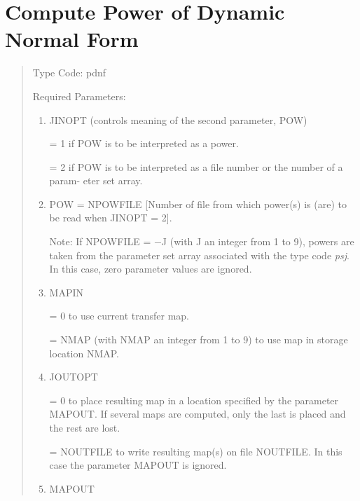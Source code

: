 \section{Compute Power of Dynamic Normal Form}
\begin{quotation}
\noindent     Type Code:  pdnf 
\vspace{5mm}

\noindent     Required Parameters:
\begin{enumerate}
      \item  JINOPT (controls meaning of the second parameter, POW)

             = 1 if POW is to be interpreted as a power.

             = 2 if POW is to be interpreted as a file number or the number
               of a param- \hspace*{1em}eter set array.

      \item  POW
             = NPOWFILE [Number of file from which power(s) is (are) to be
               read when JINOPT = 2].

             Note:  If NPOWFILE = $-$J (with J an integer from 1 to 9),
             powers are taken from the parameter set array associated with
             the type code {\em psj}.  In this case, zero parameter values are
             ignored.


      \item  MAPIN

             = 0 to use current transfer map.

             = NMAP (with NMAP an integer from 1 to 9) to use map in
               storage location \hspace*{1em}NMAP.

      \item  JOUTOPT

             = 0 to place resulting map in a location specified by the
           parameter \linebreak \hspace*{1em}MAPOUT\@.  If several maps are computed, only
           the last is placed and \hspace*{1em}the rest are lost.

             = NOUTFILE to write resulting map(s) on file NOUTFILE.  In
               this case \hspace*{1em}the parameter MAPOUT is ignored.

      \item  MAPOUT


\end{enumerate}
\end{quotation}
